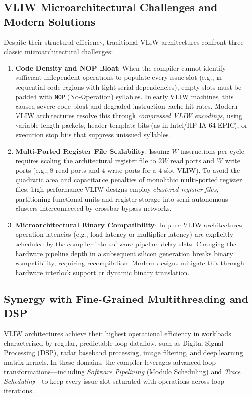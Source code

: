 \subsection{VLIW Microarchitectural Challenges and Modern Solutions}
Despite their structural efficiency, traditional VLIW architectures confront three classic microarchitectural challenges:
\begin{enumerate}
    \item \textbf{Code Density and NOP Bloat}: When the compiler cannot identify sufficient independent operations to populate every issue slot (e.g., in sequential code regions with tight serial dependencies), empty slots must be padded with \texttt{NOP} (No-Operation) syllables. In early VLIW machines, this caused severe code bloat and degraded instruction cache hit rates. Modern VLIW architectures resolve this through \emph{compressed VLIW encodings}, using variable-length packets, header template bits (as in Intel/HP IA-64 EPIC), or execution stop bits that suppress unissued syllables.
    \item \textbf{Multi-Ported Register File Scalability}: Issuing $W$ instructions per cycle requires scaling the architectural register file to $2W$ read ports and $W$ write ports (e.g., 8 read ports and 4 write ports for a 4-slot VLIW). To avoid the quadratic area and capacitance penalties of monolithic multi-ported register files, high-performance VLIW designs employ \emph{clustered register files}, partitioning functional units and register storage into semi-autonomous clusters interconnected by crossbar bypass networks.
    \item \textbf{Microarchitectural Binary Compatibility}: In pure VLIW architectures, operation latencies (e.g., load latency or multiplier latency) are explicitly scheduled by the compiler into software pipeline delay slots. Changing the hardware pipeline depth in a subsequent silicon generation breaks binary compatibility, requiring recompilation. Modern designs mitigate this through hardware interlock support or dynamic binary translation.
\end{enumerate}

\subsection{Synergy with Fine-Grained Multithreading and DSP}
VLIW architectures achieve their highest operational efficiency in workloads characterized by regular, predictable loop dataflow, such as Digital Signal Processing (DSP), radar baseband processing, image filtering, and deep learning matrix kernels. In these domains, the compiler leverages advanced loop transformations---including \textit{Software Pipelining} (Modulo Scheduling) and \textit{Trace Scheduling}---to keep every issue slot saturated with operations across loop iterations.

